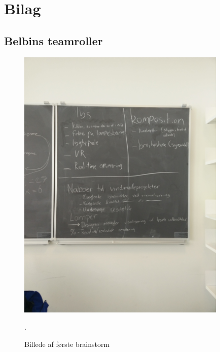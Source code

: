 \documentclass[oneside,a4paper,titlepage]{article}
\begin{document}
\section{Bilag}

\subsection{Belbins teamroller}




\begin{figure}[H]
   \centering
   \includegraphics[width=10cm]{../graphics/brainstorm_1}
   \caption{Billede af første brainstorm}.
\end{figure}
\end{document}
